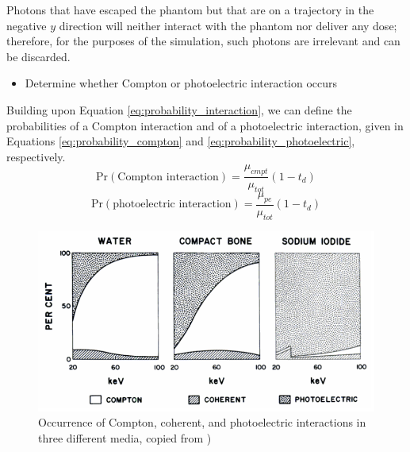 \documentclass[12pt]{article} %
\begin{document}
Photons that have escaped the phantom but that are on a trajectory in the negative $y$ direction will neither interact with the phantom nor deliver any dose; therefore, for the purposes of the simulation, such photons are irrelevant and can be discarded.

\begin{itemize}
\item Determine whether Compton or photoelectric interaction occurs
\end{itemize}
Building upon Equation \ref{eq:probability_interaction}, we can define the probabilities of a Compton interaction and of a photoelectric interaction, given in Equations \ref{eq:probability_compton} and \ref{eq:probability_photoelectric}, respectively.
\begin{equation}
\text{Pr}(\text{Compton interaction}) = \frac{\mu_{cmpt}}{\mu_{tot}}\left(1 - t_{d}\right)
\label{eq:probability_compton}
\end{equation}
\begin{equation}
\text{Pr}(\text{photoelectric interaction}) = \frac{\mu_{pe}}{\mu_{tot}}\left(1 - t_{d}\right)
\label{eq:probability_photoelectric}
\end{equation}
\begin{figure}
\centering
\includegraphics[scale=.75]{./images/water_interactions.png}
\caption{Occurrence of Compton, coherent, and photoelectric interactions in three different media, copied from \cite[p.~69]{curry1990})}
\label{fig:water_interactions}
\end{figure}
\end{document}
